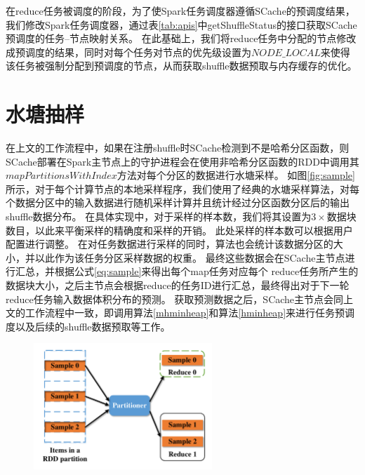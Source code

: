 在reduce任务被调度的阶段，为了使Spark任务调度器遵循SCache的预调度结果，我们修改Spark任务调度器，通过表\ref{tab:apis}中getShuffleStatus的接口获取SCache预调度的任务--节点映射关系。
在此基础上，我们将reduce任务中分配的节点修改成预调度的结果，同时对每个任务对节点的优先级设置为$NODE\_LOCAL$\cite{sparksource}来使得该任务被强制分配到预调度的节点，从而获取shuffle数据预取与内存缓存的优化。

\section{水塘抽样}
\label{sec:sampling}

在上文的工作流程中，如果在注册shuffle时SCache检测到不是哈希分区函数，则SCache部署在Spark主节点上的守护进程会在使用非哈希分区函数的RDD中调用其$mapPartitionsWithIndex$\cite{sparksource}方法对每个分区的数据进行水塘采样。
如图\ref{fig:sample}所示，对于每个计算节点的本地采样程序，我们使用了经典的水塘采样算法\cite{reservoir}，对每个数据分区中的输入数据进行随机采样计算并且统计经过分区函数分区后的输出shuffle数据分布。
在具体实现中，对于采样的样本数，我们将其设置为$3 \times $数据块数目，以此来平衡采样的精确度和采样的开销。
此处采样的样本数可以根据用户配置进行调整。
在对任务数据进行采样的同时，算法也会统计该数据分区的大小，并以此作为该任务分区采样数据的权重。
最终这些数据会在SCache主节点进行汇总，并根据公式\ref{eq:sample}来得出每个map任务对应每个
reduce任务所产生的数据块大小，之后主节点会根据reduce的任务ID进行汇总，最终得出对于下一轮reduce任务输入数据体积分布的预测。
获取预测数据之后，SCache主节点会同上文的工作流程中一致，即调用算法\ref{mhminheap}和算法\ref{hminheap}来进行任务预调度以及后续的shuffle数据预取等工作。

\begin{figure}[!htp]
	\centering
	\includegraphics[width=0.6\textwidth]{../../PPoPP-2018/fig/sample.pdf}
\end{figure}

